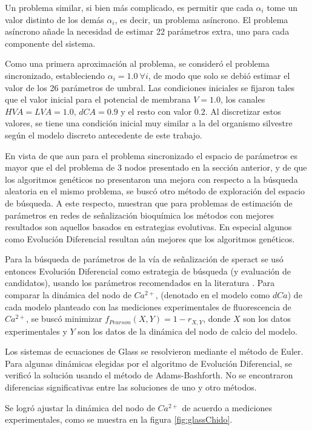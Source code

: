 Un problema similar, si bien más complicado, es permitir que cada $\alpha_i$ tome un valor distinto de los demás $\alpha_i$, es decir, un problema asíncrono. El problema asíncrono añade la necesidad de estimar 22 parámetros extra, uno para cada componente del sistema.

Como una primera aproximación al problema, se consideró el problema sincronizado, estableciendo $\alpha_i = 1.0\ \forall i$, de modo que solo se debió estimar el valor de los 26 parámetros de umbral. Las condiciones iniciales se fijaron tales que el valor inicial para el potencial de membrana $V = 1.0$, los canales $HVA=LVA=1.0$, $dCA = 0.9$ y el resto con valor $0.2$. Al discretizar estos valores, se tiene una condición inicial muy similar a la del organismo silvestre según el modelo discreto antecedente de este trabajo. 

En vista de que aun para el problema sincronizado el espacio de parámetros es mayor que el del problema de 3 nodos presentado en la sección anterior, y de que los algoritmos genéticos no presentaron una mejora con respecto a la búsqueda aleatoria en el mismo problema, se buscó otro método de exploración del espacio de búsqueda. A este respecto, \citeauthor{BangaMoles2003} \citep{BangaMoles2003} muestran que para problemas de estimación de parámetros en redes de señalización bioquímica los métodos con mejores resultados son aquellos basados en estrategias evolutivas. En especial algunos como Evolución Diferencial resultan aún mejores que los algoritmos genéticos.

Para la búsqueda de parámetros de la vía de señalización de speract se usó entonces Evolución Diferencial como estrategia de búsqueda (y evaluación de candidatos), usando los parámetros recomendados en la literatura \citeauthor{Storn1997}  \citep{Storn1997}. Para comparar la dinámica del nodo de $Ca^{2+}$, (denotado en el modelo como $dCa$) de cada modelo planteado con las mediciones experimentales de fluorescencia de $Ca^{2+}$, se buscó minimizar $f_{Pearson}(X,Y) = 1-r_{X,Y}$, donde $X$ son los datos experimentales y $Y$ son los datos de la dinámica del nodo de calcio del modelo. 

Los sistemas de ecuaciones de Glass se resolvieron mediante el método de Euler. Para algunas dinámicas elegidas por el algoritmo de Evolución Diferencial, se verificó la solución usando el método de Adams-Bashforth. No se encontraron diferencias significativas entre las soluciones de uno y otro métodos.

Se logró ajustar la dinámica del nodo de $Ca^{2+}$ de acuerdo a mediciones experimentales, como se muestra en la figura \ref{fig:glassChido}. 

